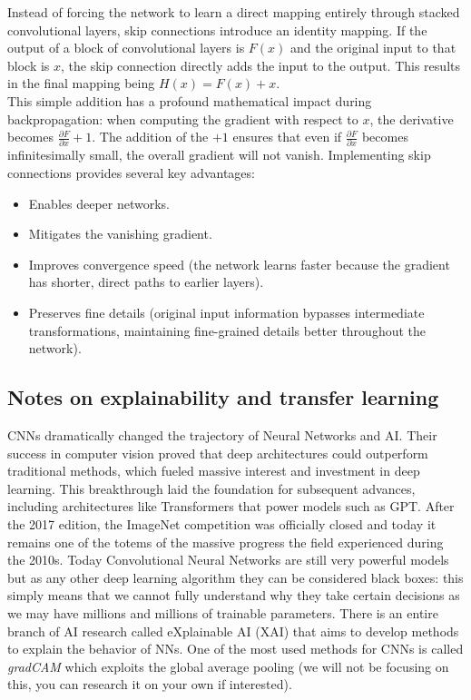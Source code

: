 Instead of forcing the network to learn a direct mapping entirely through stacked convolutional layers, skip connections introduce an identity mapping. If the output of a block of convolutional layers is $F(x)$ and the original input to that block is $x$, the skip connection directly adds the input to the output. This results in the final mapping being $H(x) = F(x) + x$. \\ 
This simple addition has a profound mathematical impact during backpropagation: when computing the gradient with respect to $x$, the derivative becomes $\frac{\partial F}{\partial x} + 1$. The addition of the $+1$ ensures that even if $\frac{\partial F}{\partial x}$ becomes infinitesimally small, the overall gradient will not vanish. 
Implementing skip connections provides several key advantages:
\begin{itemize}
    \item[-] Enables deeper networks.
    \item[-] Mitigates the vanishing gradient.
    \item[-] Improves convergence speed (the network learns faster because the gradient has shorter, direct paths to earlier layers).
    \item[-] Preserves fine details (original input information bypasses intermediate transformations, maintaining fine-grained details better throughout the network).
\end{itemize}

\subsection{Notes on explainability and transfer learning}

CNNs dramatically changed the trajectory of Neural Networks and AI. Their success in computer vision proved that deep architectures could outperform traditional methods, which fueled massive interest and investment in deep learning. This breakthrough laid the foundation for subsequent advances, including architectures like Transformers that power models such as GPT. After the 2017 edition, the ImageNet competition was officially closed and today it remains one of the totems of the massive progress the field experienced during the 2010s. Today Convolutional Neural Networks are still very powerful models but as any other deep learning algorithm they can be considered black boxes: this simply means that we cannot fully understand why they take certain decisions as we may have millions and millions of trainable parameters. There is an entire branch of AI research called eXplainable AI (XAI) that aims to develop methods to explain the behavior of NNs. One of the most used methods for CNNs is called \textit{gradCAM} which exploits the global average pooling (we will not be focusing on this, you can research it on your own if interested).


